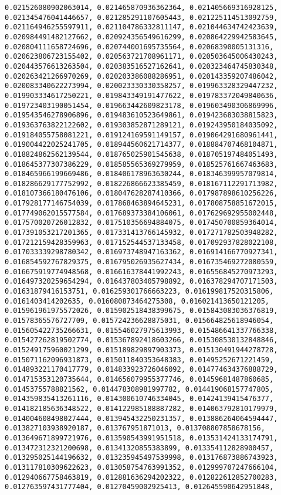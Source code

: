 \documentclass[11pt]{article}
\begin{document}
\begin{Verbatim}[commandchars=\\\{\}]
0.021526080902063014, 0.021465870936362364, 0.021405669316928125, 0.021345476041446657, 0.021285291107605443, 0.021225114513092759, 0.021164946255597911, 0.021104786332811147, 0.021044634742423639, 0.020984491482127662, 0.020924356549616299, 0.020864229942583645, 0.020804111658724696, 0.020744001695735564, 0.02068390005131316, 0.020623806723155402, 0.020563721708961171, 0.020503645006430243, 0.020443576613263504, 0.020383516527162641, 0.020323464745830348, 0.020263421266970269, 0.020203386088286951, 0.020143359207486042, 0.020083340622273994, 0.020023330330358257, 0.019963328329447232, 0.019903334617250221, 0.019843349191477622, 0.019783372049840636, 0.019723403190051454, 0.019663442609823178, 0.019603490306869996, 0.019543546278906896, 0.019483610523649861, 0.019423683038815823, 0.019363763822122602, 0.019303852871289121, 0.019243950184035092, 0.019184055758081221, 0.019124169591149157, 0.019064291680961441, 0.019004422025241705, 0.018944560621714377, 0.018884707468104871, 0.018824862562139544, 0.018765025901545638, 0.018705197484051493, 0.018645377307386229, 0.018585565369279959, 0.018525761667463683, 0.018465966199669486, 0.018406178963630244, 0.018346399957079814, 0.018286629177752992, 0.018226866623385459, 0.018167112291713982, 0.018107366180476106, 0.018047628287410366, 0.017987898610256226, 0.017928177146754039, 0.017868463894645231, 0.017808758851672015, 0.017749062015577584, 0.017689373384106061, 0.017629692955002448, 0.017570020726012832, 0.017510356694884075, 0.017450700859364014, 0.017391053217201365, 0.017331413766145932, 0.017271782503948282, 0.017212159428359963, 0.017152544537133458, 0.017092937828022108, 0.017033339298780342, 0.016973748947163362, 0.016914166770927341, 0.016854592767829375, 0.016795026935627434, 0.016735469272080559, 0.016675919774948568, 0.016616378441992243, 0.016556845270973293, 0.016497320259654294, 0.016437803405798892, 0.016378294707171503, 0.01631879416153751, 0.016259301766663223, 0.016199817520315806, 0.0161403414202635, 0.016080873464275308, 0.016021413650121205, 0.015961961975572026, 0.015902518438399675, 0.015843083036376819, 0.01578365576727709, 0.015724236628875031, 0.015664825618946054, 0.015605422735266631, 0.015546027975613993, 0.015486641337766338, 0.015427262819502774, 0.015367892418603266, 0.015308530132848846, 0.015249175960021299, 0.015189829897903373, 0.015130491944278728, 0.015071162096931873, 0.015011840353648383, 0.01495252671221459, 0.014893221170417779, 0.014833923726046092, 0.014774634376888729, 0.014715353120735644, 0.014656079955377746, 0.01459681487860685, 0.01453755788821562, 0.014478308981997782, 0.014419068157747805, 0.014359835413261116, 0.014300610746334045, 0.01424139415476377, 0.014182185636348522, 0.014122985188887282, 0.014063792810179979, 0.014004608498027444, 0.013945432250231357, 0.013886264064594447, 0.013827103938920187, 0.013767951871013, 0.013708807858678156, 0.013649671899721976, 0.013590543991951518, 0.013531424133174791, 0.013472312321200698, 0.01341320855383899, 0.013354112828900457, 0.013295025144196632, 0.013235945497539998, 0.013176873886743923, 0.013117810309622623, 0.013058754763991352, 0.012999707247666104, 0.012940667758463819, 0.012881636294202322, 0.012822612852700283, 0.012763597431777404, 0.01270459002925413, 0.012645590642951848, 
\end{Verbatim}
\end{document}
